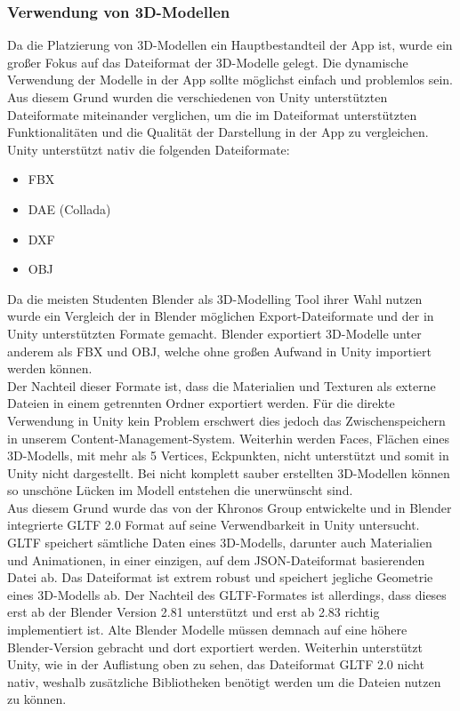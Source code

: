 \documentclass[12pt,a4paper]{article}
\begin{document}
\subsubsection{Verwendung von 3D-Modellen}
Da die Platzierung von 3D-Modellen ein Hauptbestandteil der App ist, wurde ein großer Fokus auf das Dateiformat der 3D-Modelle gelegt. Die dynamische Verwendung der Modelle in der App sollte möglichst einfach und problemlos sein.\\ 
Aus diesem Grund wurden die verschiedenen von Unity unterstützten Dateiformate miteinander verglichen, um die im Dateiformat unterstützten Funktionalitäten und die Qualität der Darstellung in der App zu vergleichen.\\
Unity unterstützt nativ die folgenden Dateiformate:
\begin{itemize}
\item FBX
\item DAE (Collada)
\item DXF
\item OBJ
\end{itemize}
Da die meisten Studenten Blender als 3D-Modelling Tool ihrer Wahl nutzen wurde ein Vergleich der in Blender möglichen Export-Dateiformate und der in Unity unterstützten Formate gemacht. Blender exportiert 3D-Modelle unter anderem als FBX und OBJ, welche ohne großen Aufwand in Unity importiert werden können.\\
Der Nachteil dieser Formate ist, dass die Materialien und Texturen als externe Dateien in einem getrennten Ordner exportiert werden. Für die direkte Verwendung in Unity kein Problem erschwert dies jedoch das Zwischenspeichern in unserem Content-Management-System. Weiterhin werden \glqq Faces\grqq, Flächen eines 3D-Modells, mit mehr als 5 \glqq Vertices\grqq, Eckpunkten, nicht unterstützt und somit in Unity nicht dargestellt. Bei nicht komplett sauber erstellten 3D-Modellen können so unschöne Lücken im Modell entstehen die unerwünscht sind.\\
Aus diesem Grund wurde das von der Khronos Group entwickelte und in Blender integrierte GLTF 2.0 Format auf seine Verwendbarkeit in Unity untersucht. GLTF speichert sämtliche Daten eines 3D-Modells, darunter auch Materialien und Animationen, in einer einzigen, auf dem JSON-Dateiformat basierenden Datei ab. Das Dateiformat ist extrem robust und speichert jegliche Geometrie eines 3D-Modells ab. Der Nachteil des GLTF-Formates ist allerdings, dass dieses erst ab der Blender Version 2.81 unterstützt und erst ab 2.83 richtig implementiert ist. Alte Blender Modelle müssen demnach auf eine höhere Blender-Version gebracht und dort exportiert werden. Weiterhin unterstützt Unity, wie in der Auflistung oben zu sehen, das Dateiformat GLTF 2.0 nicht nativ, weshalb zusätzliche Bibliotheken benötigt werden um die Dateien nutzen zu können.\\
\end{document}
